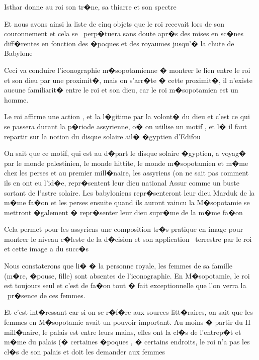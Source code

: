 \documentclass{article}
\begin{document}
Isthar donne au roi son tr�ne, sa thiarre et son spectre 


\bigskip

Et nous avons ainsi la liste de cinq objets que le roi recevait lors de son couronnement et cela se \ perp�tuera sans doute apr�s des mises en sc�nes diff�rentes en fonction des �poques et des royaumes jusqu'� la chute de Babylone


\bigskip

Ceci va conduire l'iconographie m�sopotamienne � montrer le lien entre le roi et son dieu par une proximit�, mais on s'arr�te � cette proximit�, il n'existe aucune familiarit� entre le roi et son dieu, car le roi m�sopotamien est un homme.

Le roi affirme une action , et la l�gitime par la volont� du dieu et c'est ce qui se passera durant la p�riode assyrienne, o� on utilise un motif , et l� il faut repartir sur la notion du disque solaire ail� �gyptien d'Edifou


\bigskip

On sait que ce motif, qui est au d�part le disque solaire �gyptien, a voyag� par le monde palestinien, le monde hittite, le monde m�sopotamien et m�me chez les perses et au premier mill�naire, les assyriens (on ne sait pas comment ils en ont eu l'id�e, repr�sentent leur dieu national Assur comme un buste sortant de l'astre solaire. Les babyloniens repr�senteront leur dieu Marduk de la m�me fa�on et les perses ensuite quand ils auront vaincu la M�sopotamie se mettront �galement � repr�senter leur dieu supr�me de la m�me fa�on

\newline
Cela permet pour les assyriens une composition tr�s pratique en image pour montrer le niveau c�leste de la d�cision et son application \ terrestre par le roi et cette image a du succ�s


\bigskip

Nous constaterons que li� � la personne royale, les femmes de sa famille (m�re, �pouse, fille) sont absentes de l'iconographie. En M�sopotamie, le roi est toujours seul et c'est de fa�on tout � fait exceptionnelle que l'on verra la \ pr�sence de ces femmes.


\bigskip

Et c'est int�ressant car si on se r�f�re aux sources litt�raires, on sait que les femmes en M�sopotamie avait un pouvoir important. Au moins � partir du II mill�naire, le palais est entre leurs mains, elles ont la cl�s de l'entrep�t et m�me du palais (� certaines �poques , � certains endroits, le roi n'a pas les cl�s de son palais et doit les demander aux femmes
\end{document}
